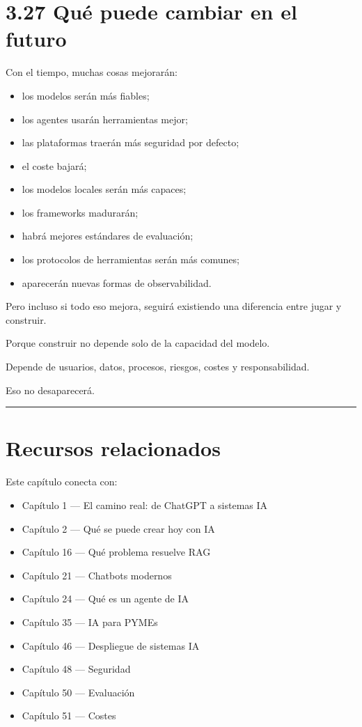 \section{3.27 Qué puede cambiar en el
futuro}\label{quuxe9-puede-cambiar-en-el-futuro-2}

Con el tiempo, muchas cosas mejorarán:

\begin{itemize}
\tightlist
\item
  los modelos serán más fiables;
\item
  los agentes usarán herramientas mejor;
\item
  las plataformas traerán más seguridad por defecto;
\item
  el coste bajará;
\item
  los modelos locales serán más capaces;
\item
  los frameworks madurarán;
\item
  habrá mejores estándares de evaluación;
\item
  los protocolos de herramientas serán más comunes;
\item
  aparecerán nuevas formas de observabilidad.
\end{itemize}

Pero incluso si todo eso mejora, seguirá existiendo una diferencia entre
jugar y construir.

Porque construir no depende solo de la capacidad del modelo.

Depende de usuarios, datos, procesos, riesgos, costes y responsabilidad.

Eso no desaparecerá.

\begin{center}\rule{0.5\linewidth}{0.5pt}\end{center}

\section{Recursos relacionados}\label{recursos-relacionados-2}

Este capítulo conecta con:

\begin{itemize}
\tightlist
\item
  Capítulo 1 --- El camino real: de ChatGPT a sistemas IA
\item
  Capítulo 2 --- Qué se puede crear hoy con IA
\item
  Capítulo 16 --- Qué problema resuelve RAG
\item
  Capítulo 21 --- Chatbots modernos
\item
  Capítulo 24 --- Qué es un agente de IA
\item
  Capítulo 35 --- IA para PYMEs
\item
  Capítulo 46 --- Despliegue de sistemas IA
\item
  Capítulo 48 --- Seguridad
\item
  Capítulo 50 --- Evaluación
\item
  Capítulo 51 --- Costes
\end{itemize}

